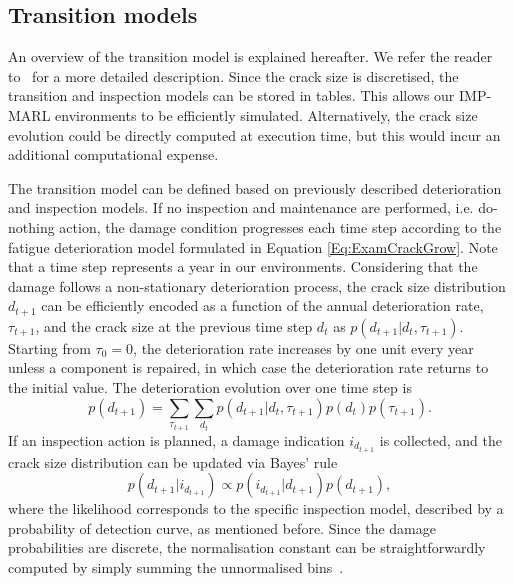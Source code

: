 \subsection{Transition models}
An overview of the transition model is explained hereafter.
We refer the reader to~\citep{morato2022syst} for a more detailed description.
Since the crack size is discretised, the transition and inspection models can be stored in tables.
This allows our IMP-MARL environments to be efficiently simulated.
Alternatively, the crack size evolution could be directly computed at execution time, but this would incur an additional computational expense.

The transition model can be defined based on previously described deterioration and inspection models. 
If no inspection and maintenance are performed, i.e. do-nothing action, the damage condition progresses each time step according to the fatigue deterioration model formulated in Equation \ref{Eq:ExamCrackGrow}.
Note that a time step represents a year in our environments.
Considering that the damage follows a non-stationary deterioration process, the crack size distribution $d_{t+1}$ can be efficiently encoded as a function of the annual deterioration rate, $\tau_{t+1}$, and the crack size at the previous time step $d_{t}$ as $p(d_{t+1}|d_t,\tau_{t+1})$. 
Starting from $\tau_{0}=0$, the deterioration rate increases by one unit every year unless a component is repaired, in which case the deterioration rate returns to the initial value. 
The deterioration evolution over one time step is
\begin{equation} \label{eq:ex_pod2}
    p(d_{t+1}) =  \sum_{\tau_{t+1}} \sum_{d_t} p(d_{t+1}|d_t,\tau_{t+1}) p(d_{t}) p(\tau_{t+1}) .
\end{equation}
If an inspection action is planned, a damage indication $i_{d_{t+1}}$ is collected, and the crack size distribution can be updated via Bayes' rule
\begin{equation} \label{eq:ex_pod3}
    p(d_{t+1}|i_{d_{t+1}}) \propto  p(i_{d_{t+1}}|d_{t+1}) p(d_{t+1})   ,
\end{equation}
where the likelihood corresponds to the specific inspection model, described by a probability of detection curve, as mentioned before.
Since the damage probabilities are discrete, the normalisation constant can be straightforwardly computed by simply summing the unnormalised bins~\citep{morato2022optimal}.

